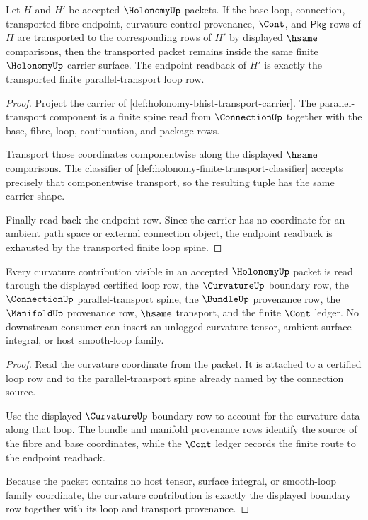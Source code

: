 \begin{theorem}
\label{thm:holonomy-parallel-transport-stability}
Let $H$ and $H'$ be accepted $\HolonomyUp$ packets. If the base loop, connection, transported fibre endpoint, curvature-control provenance, $\Cont$, and $\mathsf{Pkg}$ rows of $H$ are transported to the corresponding rows of $H'$ by displayed $\hsame$ comparisons, then the transported packet remains inside the same finite $\HolonomyUp$ carrier surface. The endpoint readback of $H'$ is exactly the transported finite parallel-transport loop row.
\end{theorem}
\begin{proof}
Project the carrier of \autoref{def:holonomy-bhist-transport-carrier}. The parallel-transport component is a finite spine read from $\ConnectionUp$ together with the base, fibre, loop, continuation, and package rows.

Transport those coordinates componentwise along the displayed $\hsame$ comparisons. The classifier of \autoref{def:holonomy-finite-transport-classifier} accepts precisely that componentwise transport, so the resulting tuple has the same carrier shape.

Finally read back the endpoint row. Since the carrier has no coordinate for an ambient path space or external connection object, the endpoint readback is exhausted by the transported finite loop spine.
\end{proof}

\begin{theorem}
\label{thm:holonomy-curvature-loop-boundary}
Every curvature contribution visible in an accepted $\HolonomyUp$ packet is read through the displayed certified loop row, the $\CurvatureUp$ boundary row, the $\ConnectionUp$ parallel-transport spine, the $\BundleUp$ provenance row, the $\ManifoldUp$ provenance row, $\hsame$ transport, and the finite $\Cont$ ledger. No downstream consumer can insert an unlogged curvature tensor, ambient surface integral, or host smooth-loop family.
\end{theorem}
\begin{proof}
Read the curvature coordinate from the packet. It is attached to a certified loop row and to the parallel-transport spine already named by the connection source.

Use the displayed $\CurvatureUp$ boundary row to account for the curvature data along that loop. The bundle and manifold provenance rows identify the source of the fibre and base coordinates, while the $\Cont$ ledger records the finite route to the endpoint readback.

Because the packet contains no host tensor, surface integral, or smooth-loop family coordinate, the curvature contribution is exactly the displayed boundary row together with its loop and transport provenance.
\end{proof}

